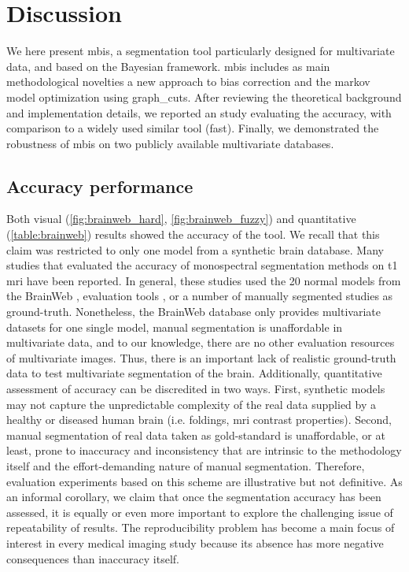 \section{Discussion}
\label{sec:discussion}
We here present \gls*{mbis}, a segmentation tool particularly designed for
  multivariate data, and based on the Bayesian framework.
\Gls*{mbis} includes as main methodological novelties a new approach to 
  bias correction and the \gls*{markov} model optimization using
  \gls*{graph_cuts}.
After reviewing the theoretical background and implementation details,
  we reported an study evaluating the accuracy, with comparison to a widely
  used similar tool (\gls*{fast}).
Finally, we demonstrated the robustness of \gls*{mbis} on two publicly available
  multivariate databases.

\subsection{Accuracy performance}
Both visual (\autoref{fig:brainweb_hard}, \autoref{fig:brainweb_fuzzy}) and
  quantitative (\autoref{table:brainweb}) results showed the accuracy
  of the tool.
We recall that this claim was restricted to only one model from a synthetic brain
  database.
Many studies \citep{cuadra_comparison_2005,de_boer_accuracy_2010,ashburner_unified_2005,
  klauschen_evaluation_2009} that evaluated the accuracy of monospectral segmentation
  methods on \gls*{t1} \gls*{mri} have been reported.
In general, these studies used the 20 normal models from the BrainWeb 
  \citep{aubert-broche_twenty_2006}, evaluation tools \citep{shattuck_online_2009},
  or a number of manually segmented studies as ground-truth.
Nonetheless, the BrainWeb database only provides multivariate datasets for one
  single model, manual segmentation is unaffordable in multivariate data, and
  to our knowledge, there are no other evaluation resources of multivariate images.
Thus, there is an important lack of realistic ground-truth data to test
  multivariate segmentation of the brain.
Additionally, quantitative assessment of accuracy can be discredited in two ways.
First, synthetic models may not capture the unpredictable complexity of the real
  data supplied by a healthy or diseased human brain (i.e. foldings, \gls*{mri} 
  contrast properties).
Second, manual segmentation of real data taken as gold-standard
  is unaffordable, or at least, prone to inaccuracy and inconsistency
  that are intrinsic to the methodology itself and the effort-demanding nature of manual
  segmentation.
Therefore, evaluation experiments based on this scheme are illustrative
   but not definitive.
As an informal corollary, we claim that once the segmentation accuracy has been 
  assessed, it is equally or even more important to explore the challenging issue 
  of repeatability of results.
The reproducibility problem has become a main focus of interest 
  \citep{landman_effects_2007,de_boer_accuracy_2010} in every medical imaging study 
  because its absence has more negative consequences than inaccuracy itself.

